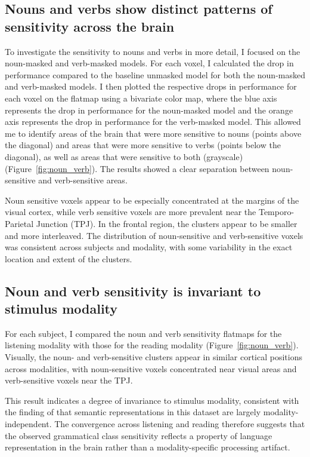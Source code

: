 \documentclass[a4paper]{article}
\begin{document}
\subsection*{Nouns and verbs show distinct patterns of sensitivity across the brain}
To investigate the sensitivity to nouns and verbs in more detail, I focused on the noun-masked and verb-masked models. For each voxel, I calculated the drop in performance compared to the baseline unmasked model for both the noun-masked and verb-masked models. I then plotted the respective drops in performance for each voxel on the flatmap using a bivariate color map, where the blue axis represents the drop in performance for the noun-masked model and the orange axis represents the drop in performance for the verb-masked model. This allowed me to identify areas of the brain that were more sensitive to nouns (points above the diagonal) and areas that were more sensitive to verbs (points below the diagonal), as well as areas that were sensitive to both (grayscale) (Figure~\ref{fig:noun_verb}). The results showed a clear separation between noun-sensitive and verb-sensitive areas. 

Noun sensitive voxels appear to be especially concentrated at the margins of the visual cortex, while verb sensitive voxels are more prevalent near the Temporo-Parietal Junction (TPJ). In the frontal region, the clusters appear to be smaller and more interleaved. The distribution of noun-sensitive and verb-sensitive voxels was consistent across subjects and modality, with some variability in the exact location and extent of the clusters. 
\FloatBarrier
\subsection*{Noun and verb sensitivity is invariant to stimulus modality}
For each subject, I compared the noun and verb sensitivity flatmaps for the listening modality with those for the reading modality (Figure~\ref{fig:noun_verb}). Visually, the noun- and verb-sensitive clusters appear in similar cortical positions across modalities, with noun-sensitive voxels concentrated near visual areas and verb-sensitive voxels near the TPJ. 

This result indicates a degree of invariance to stimulus modality, consistent with the finding of \textcite{deniz_representation_2019} that semantic representations in this dataset are largely modality-independent. The convergence across listening and reading therefore suggests that the observed grammatical class sensitivity reflects a property of language representation in the brain rather than a modality-specific processing artifact.
\end{document}

